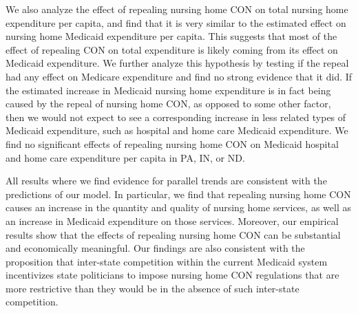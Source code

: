 \documentclass[../Main.tex]{subfiles}
\begin{document}
We also analyze the effect of repealing nursing home CON on total nursing home expenditure per capita, and find that it is very similar to the estimated effect on nursing home Medicaid expenditure per capita. This suggests that most of the effect of repealing CON on total expenditure is likely coming from its effect on Medicaid expenditure. We further analyze this hypothesis by testing if the repeal had any effect on Medicare expenditure and find no strong evidence that it did. If the estimated increase in Medicaid nursing home expenditure is in fact being caused by the repeal of nursing home CON, as opposed to some other factor, then we would not expect to see a corresponding increase in less related types of Medicaid expenditure, such as hospital and home care Medicaid expenditure. We find no significant effects of repealing nursing home CON on Medicaid hospital and home care expenditure per capita in PA, IN, or ND. 

All results where we find evidence for parallel trends are consistent with the predictions of our model. In particular, we find that repealing nursing home CON causes an increase in the quantity and quality of nursing home services, as well as an increase in Medicaid expenditure on those services. Moreover, our empirical results show that the effects of repealing nursing home CON can be substantial and economically meaningful. Our findings are also consistent with the proposition that inter-state competition within the current Medicaid system incentivizes state politicians to impose nursing home CON regulations that are more restrictive than they would be in the absence of such inter-state competition.
\end{document}
